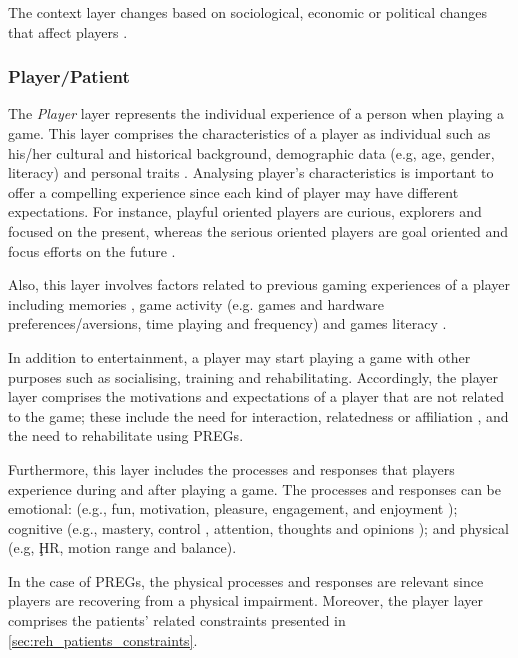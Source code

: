 The context layer changes based on sociological, economic or political changes that affect players \autocite{Nackea2}.

\subsubsection{Player/Patient}

The \textit{Player} layer represents the individual experience of a person when playing a game. This layer comprises the characteristics of a player as individual \autocite{Elson2014} such as his/her cultural \autocite{Elson2014} and historical \autocite{Mayra} background, demographic data (e.g, age, gender, literacy) \autocite{Elson2014,Fernandez2008,Ferrara} and personal traits \autocite{Elson2014}. Analysing player's characteristics is important to offer a compelling experience since each kind of player may have different expectations. For instance, playful oriented players are curious, explorers and focused on the present, whereas the serious oriented players are goal oriented and focus efforts on the future \autocite{Fernandez2008}.

Also, this layer involves factors related to previous gaming experiences of a player including memories \autocite{Elson2014}, game activity (e.g. games and hardware preferences/aversions, time playing and frequency) \autocite{Fernandez2008,Nackea2,Nacked,Mayra} and games literacy \autocite{Mayra}.

In addition to entertainment, a player may start playing a game with other purposes such as socialising, training and rehabilitating. Accordingly, the player layer comprises the motivations and expectations of a player that are not related to the game; these include the need for interaction, relatedness or affiliation \autocite{DeKort2007b,Mayra}, and the need to rehabilitate using \acp{PREG}.

Furthermore, this layer includes the processes and responses that players experience during and after playing a game. The processes and responses can be emotional: (e.g., fun, motivation, pleasure, engagement, \autocite{Fernandez2008,Ferrara} and enjoyment \autocite{Nacked}); cognitive (e.g., mastery, control \autocite{Ferrara}, attention, thoughts and opinions \autocite{Fernandez2008}); and physical (e.g, \c{HR}, motion range and balance).

In the case of \acp{PREG}, the physical processes and responses are relevant since players are recovering from a physical impairment. Moreover, the player layer comprises the patients' related constraints presented in \autoref{sec:reh_patients_constraints}.

